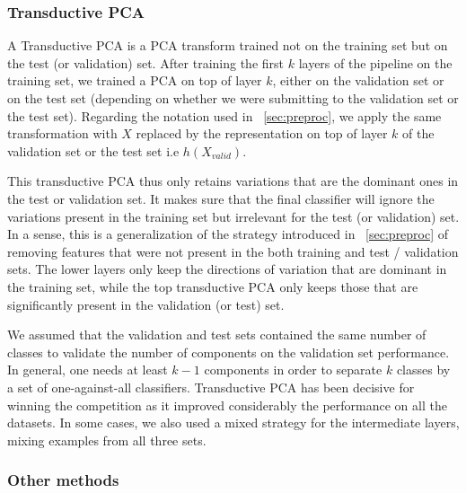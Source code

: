 \subsubsection{Transductive PCA}

A Transductive PCA is a PCA transform trained not on the training set but on
the test (or validation) set. After training the first $k$ layers of the
pipeline on the training set, we trained a PCA on top of layer $k$, either on
the validation set or on the test set (depending on whether we were submitting
to the validation set or the test set). Regarding the notation used in
~\ref{sec:preproc}, we apply the same transformation with $X$ replaced by the
representation on top of layer $k$ of the validation set or the test set i.e
$h(X_{valid})$.

This transductive PCA thus only retains variations that are the dominant ones
in the test or validation set. It makes sure that the final classifier will
ignore the variations present in the training set but irrelevant for the test
(or validation) set.  In a sense, this is a generalization of the strategy
introduced in ~\ref{sec:preproc} of removing features that were not present in
the both training and test / validation sets. The lower layers only keep the
directions of variation that are dominant in the training set, while the top
transductive PCA only keeps those that are significantly present in the
validation (or test) set.

We assumed that the validation and test sets contained the same number of classes to
validate the number of components on the validation set performance. In general,
one needs at least $k-1$ components in order to separate $k$ classes by
a set of one-against-all classifiers.
Transductive PCA has been decisive for winning the competition as it improved considerably
the performance on all the datasets. 
In some cases, we also used a mixed strategy for the intermediate layers, mixing
examples from all three sets.

\subsubsection{Other methods}
 


